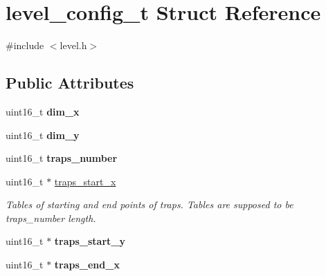 \hypertarget{structlevel__config__t}{}\section{level\+\_\+config\+\_\+t Struct Reference}
\label{structlevel__config__t}


{\ttfamily \#include $<$level.\+h$>$}

\subsection*{Public Attributes}
\begin{DoxyCompactItemize}
\item 
uint16\+\_\+t {\bfseries dim\+\_\+x}\hypertarget{structlevel__config__t_a37e630b63b86d807126f0210b1552ad8}{}\label{structlevel__config__t_a37e630b63b86d807126f0210b1552ad8}

\item 
uint16\+\_\+t {\bfseries dim\+\_\+y}\hypertarget{structlevel__config__t_a04b6231c3264ad4cb624e46c7fe75431}{}\label{structlevel__config__t_a04b6231c3264ad4cb624e46c7fe75431}

\item 
uint16\+\_\+t {\bfseries traps\+\_\+number}\hypertarget{structlevel__config__t_a7f0c36bada68e5ef70b70162f17cf178}{}\label{structlevel__config__t_a7f0c36bada68e5ef70b70162f17cf178}

\item 
uint16\+\_\+t $\ast$ \hyperlink{structlevel__config__t_a72e1725a63980cc29717ffc3235a5ee6}{traps\+\_\+start\+\_\+x}\hypertarget{structlevel__config__t_a72e1725a63980cc29717ffc3235a5ee6}{}\label{structlevel__config__t_a72e1725a63980cc29717ffc3235a5ee6}

\begin{DoxyCompactList}\small\item\em Tables of starting and end points of traps. Tables are supposed to be traps\+\_\+number length. \end{DoxyCompactList}\item 
uint16\+\_\+t $\ast$ {\bfseries traps\+\_\+start\+\_\+y}\hypertarget{structlevel__config__t_af84502088cd070d25bc59290b7c829a4}{}\label{structlevel__config__t_af84502088cd070d25bc59290b7c829a4}

\item 
uint16\+\_\+t $\ast$ {\bfseries traps\+\_\+end\+\_\+x}\hypertarget{structlevel__config__t_ae922a7a136f89379d02c717bf7bf3038}{}\label{structlevel__config__t_ae922a7a136f89379d02c717bf7bf3038}


\end{DoxyCompactItemize}
